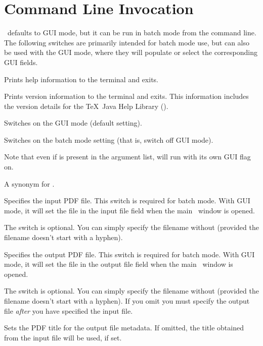 \chapter{Command Line Invocation}
\label{sec:cmdline}


\Jmakepdfx\ defaults to \gls{GUI} mode, but it can be run in batch
mode from the command line. The following switches are primarily
intended for batch mode use, but can also be used with the \gls{GUI}
mode, where they will populate or select the corresponding \gls{GUI} fields.

Prints help information to the terminal and exits.

Prints version information to the terminal and exits.
This information includes the version details for
the \TeX\ Java Help Library ().

Switches on the \gls{GUI} mode (default setting).

Switches on the batch mode setting (that is, switch off \gls{GUI}
mode).

\begin{important}
Note that even if  is present in the argument list, 
 will run with its own \gls{GUI} flag on.
\end{important}

A synonym for .

Specifies the input PDF file. This switch is required for batch mode. With
\gls{GUI} mode, it will set the file in the input file field when the main
\Jmakepdfx\ window is opened.

The  switch is optional. You can simply specify the
filename without  (provided the filename doesn't start
with a hyphen).

Specifies the output PDF file. This switch is required for batch mode. With
\gls{GUI} mode, it will set the file in the output file field when the main
\Jmakepdfx\ window is opened.

The  switch is optional. You can simply specify the
filename without  (provided the filename doesn't start
with a hyphen). If you omit  you must specify the
output file \emph{after} you have specified the input file.

Sets the PDF title for the output file metadata. If omitted, the title
obtained from the input file will be used, if set.

